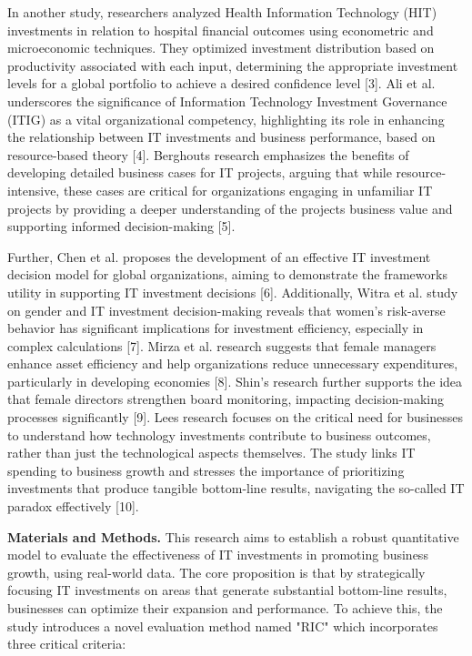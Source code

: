 \documentclass[
]{article}
\begin{document}
In another study, researchers analyzed Health Information Technology
(HIT) investments in relation to hospital financial outcomes using
econometric and microeconomic techniques. They optimized investment
distribution based on productivity associated with each input,
determining the appropriate investment levels for a global portfolio to
achieve a desired confidence level {[}3{]}. Ali et al. underscores the
significance of Information Technology Investment Governance (ITIG) as a
vital organizational competency, highlighting its role in enhancing the
relationship between IT investments and business performance, based on
resource-based theory {[}4{]}. Berghout\textquotesingle s research
emphasizes the benefits of developing detailed business cases for IT
projects, arguing that while resource-intensive, these cases are
critical for organizations engaging in unfamiliar IT projects by
providing a deeper understanding of the project\textquotesingle s
business value and supporting informed decision-making {[}5{]}.

Further, Chen et al. proposes the development of an effective IT
investment decision model for global organizations, aiming to
demonstrate the framework\textquotesingle s utility in supporting IT
investment decisions {[}6{]}. Additionally, Witra et al. study on gender
and IT investment decision-making reveals that women's risk-averse
behavior has significant implications for investment efficiency,
especially in complex calculations {[}7{]}. Mirza et al. research
suggests that female managers enhance asset efficiency and help
organizations reduce unnecessary expenditures, particularly in
developing economies {[}8{]}. Shin's research further supports the idea
that female directors strengthen board monitoring, impacting
decision-making processes significantly {[}9{]}. Lee\textquotesingle s
research focuses on the critical need for businesses to understand how
technology investments contribute to business outcomes, rather than just
the technological aspects themselves. The study links IT spending to
business growth and stresses the importance of prioritizing investments
that produce tangible bottom-line results, navigating the so-called IT
paradox effectively {[}10{]}.

\textbf{Materials and Methods.} This research aims to establish a robust
quantitative model to evaluate the effectiveness of IT investments in
promoting business growth, using real-world data. The core proposition
is that by strategically focusing IT investments on areas that generate
substantial bottom-line results, businesses can optimize their expansion
and performance. To achieve this, the study introduces a novel
evaluation method named "RIC" which incorporates three critical
criteria:
\end{document}

